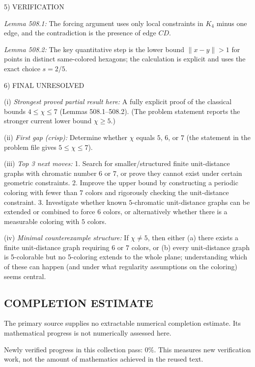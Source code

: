 5) VERIFICATION

\emph{Lemma 508.1:} The forcing argument uses only local constraints in $K_4$ minus one edge, and the contradiction is the presence of edge $CD$.

\emph{Lemma 508.2:} The key quantitative step is the lower bound $\lVert x-y\rVert>1$ for points in distinct same-colored hexagons; the calculation is explicit and uses the exact choice $s=2/5$.

6) FINAL
UNRESOLVED

(i) \emph{Strongest proved partial result here:} A fully explicit proof of the classical bounds $4\le \chi\le 7$ (Lemmas 508.1--508.2). (The problem statement reports the stronger current lower bound $\chi\ge 5$.)

(ii) \emph{First gap (crisp):} Determine whether $\chi$ equals $5$, $6$, or $7$ (the statement in the problem file gives $5\le \chi\le 7$).

(iii) \emph{Top 3 next moves:}
1. Search for smaller/structured finite unit-distance graphs with chromatic number $6$ or $7$, or prove they cannot exist under certain geometric constraints.
2. Improve the upper bound by constructing a periodic coloring with fewer than $7$ colors and rigorously checking the unit-distance constraint.
3. Investigate whether known $5$-chromatic unit-distance graphs can be extended or combined to force $6$ colors, or alternatively whether there is a measurable coloring with $5$ colors.

(iv) \emph{Minimal counterexample structure:} If $\chi\ne 5$, then either (a) there exists a finite unit-distance graph requiring $6$ or $7$ colors, or (b) every unit-distance graph is 5-colorable but no 5-coloring extends to the whole plane; understanding which of these can happen (and under what regularity assumptions on the coloring) seems central.


\subsection*{COMPLETION ESTIMATE}
The primary source supplies no extractable numerical completion estimate. Its mathematical progress is not numerically assessed here.

Newly verified progress in this collection pass: $0\%$. This measures new verification work, not the amount of mathematics achieved in the reused text.
